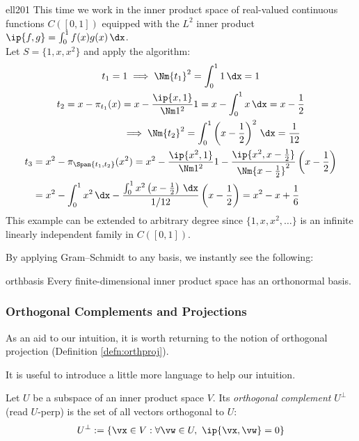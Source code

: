 \begin{example}{}{ell201}
This time we work in the inner product space of real-valued continuous functions $C([0,1])$ equipped with the $L^2$ inner product $\ip{f,g}=\int_0^1f(x)g(x)\,\dx$.\\[5pt]
Let $S=\{1,x,x^2\}$ and apply the algorithm:
	\begin{gather*}
	t_1=1 \implies \Nm{t_1}^2=\int_0^11\,\dx=1\\
	\begin{aligned}
	t_2=x-\pi_{t_1}(x)&=x-\frac{\ip{x,1}}{\Nm 1^2}1= x-\int_0^1x\,\dx =x-\frac 12\\
	&\implies \Nm{t_2}^2=\int_0^1\left(x-\frac 12\right)^2\,\dx=\frac 1{12}
	\end{aligned}\\
	\begin{aligned}
	t_3&=x^2-\pi_{\Span\{t_1,t_2\}}(x^2)= x^2-\frac{\ip{x^2,1}}{\Nm 1^2}1-\frac{\ip{x^2,x-\frac 12}}{\Nm{x-\frac 12}^2}\left(x-\frac 12\right)\\
	&=x^2-\int_0^1x^2\,\dx-\frac{\int_0^1x^2\left(x-\frac 12\right)\,\dx}{1/12}\left(x-\frac 12\right) =x^2-x+\frac 16
	\end{aligned}
	\end{gather*}
	This example can be extended to arbitrary degree since $\{1,x,x^2,\ldots\}$ is an infinite linearly independent family in $C([0,1])$. 
\end{example}

By applying Gram--Schmidt to any basis, we instantly see the following:

\begin{cor}{}{orthbasis}
Every finite-dimensional inner product space has an orthonormal basis.
\end{cor}

\subsubsection*{Orthogonal Complements and Projections}

As an aid to our intuition, it is worth returning to the notion of orthogonal projection (Definition \ref{defn:orthproj}).

It is useful to introduce a little more language to help our intuition.

\begin{defn}{}{}
Let $U$ be a subspace of an inner product space $V$. Its \emph{orthogonal complement} $U^\perp$ (read $U$-perp) is the set of all vectors orthogonal to $U$:
\[U^\perp:=\{\vx\in V:\forall\vw\in U,\ \ip{\vx,\vw}=0\}\]
\end{defn}

